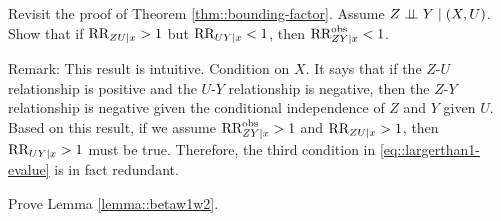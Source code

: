\begin{HomeworkProblem}\label{exr:17-2}

Revisit the proof of Theorem \ref{thm::bounding-factor}. Assume $Z\mathrel{\perp\!\!\!\perp} Y \mid (X, U)$. Show that if $ \text{RR}_{ZU\mid x} > 1$ but $ \text{RR}_{UY\mid x} < 1$, then $\text{RR}_{ZY\mid x}^{\textup{obs}} < 1$.


Remark:
This result is intuitive. Condition on $X.$ It says that if the $Z$-$U$ relationship is positive and the $U$-$Y$ relationship is negative, then the $Z$-$Y$ relationship is negative given the conditional independence of $Z$ and $Y$ given $U$.
Based on this result, if we assume $\text{RR}_{ZY\mid x}^{\textup{obs}} > 1$ and $ \text{RR}_{ZU\mid x} > 1$, then $ \text{RR}_{UY\mid x} > 1$ must be true.
Therefore, the third condition in \eqref{eq::largerthan1-evalue} is in fact redundant.



\end{HomeworkProblem}

\begin{HomeworkProblem}\label{exr:17-3}

Prove Lemma \ref{lemma::betaw1w2}.

\end{HomeworkProblem}

